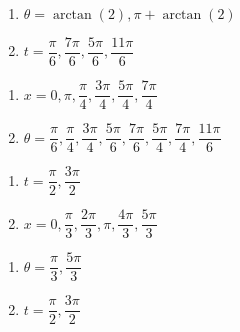 \documentclass{ximera}
\begin{document}
\begin{multicols}{2}

\begin{enumerate}

\setcounter{enumi}{\value{HW}}

\item  $\theta=\arctan(2), \pi + \arctan(2)$ 
\item  $t = \dfrac{\pi}{6}, \dfrac{7\pi}{6}, \dfrac{5\pi}{6}, \dfrac{11\pi}{6}$

\setcounter{HW}{\value{enumi}}

\end{enumerate}

\end{multicols}

\begin{multicols}{2}

\begin{enumerate}

\setcounter{enumi}{\value{HW}}

\item  $x = 0, \pi, \dfrac{\pi}{4}, \dfrac{3\pi}{4}, \dfrac{5\pi}{4}, \dfrac{7\pi}{4}$
\item  $\theta = \dfrac{\pi}{6}, \dfrac{\pi}{4}, \dfrac{3\pi}{4}, \dfrac{5\pi}{6}, \dfrac{7\pi}{6}, \dfrac{5\pi}{4}, \dfrac{7\pi}{4}, \dfrac{11\pi}{6}$

\setcounter{HW}{\value{enumi}}

\end{enumerate}

\end{multicols}

\begin{multicols}{2}

\begin{enumerate}

\setcounter{enumi}{\value{HW}}

\item  $t = \dfrac{\pi}{2}, \dfrac{3\pi}{2}$
\item $x = 0, \dfrac{\pi}{3}, \dfrac{2\pi}{3}, \pi, \dfrac{4\pi}{3}, \dfrac{5\pi}{3}$

\setcounter{HW}{\value{enumi}}

\end{enumerate}

\end{multicols}

\begin{multicols}{2}

\begin{enumerate}

\setcounter{enumi}{\value{HW}}

\item $\theta  = \dfrac{\pi}{3}, \dfrac{5\pi}{3}$
\item $t = \dfrac{\pi}{2}, \dfrac{3\pi}{2}$

\setcounter{HW}{\value{enumi}}

\end{enumerate}

\end{multicols}
\end{document}
